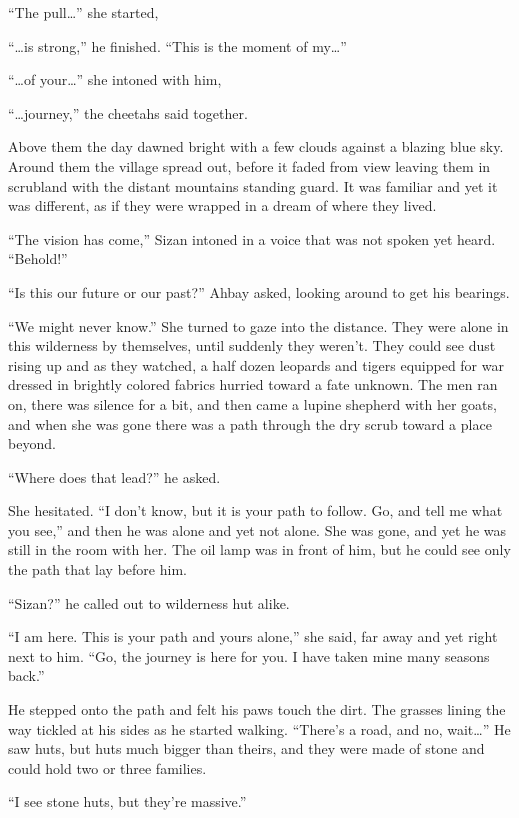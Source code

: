 ``The pull\ldots'' she started,

``\ldots{}is strong,'' he finished. ``This is the moment of my\ldots''

``\ldots{}of your\ldots'' she intoned with him,

``\ldots{}journey,'' the cheetahs said together.

Above them the day dawned bright with a few clouds against a blazing blue sky. Around them the village spread out, before it faded from view leaving them in scrubland with the distant mountains standing guard. It was familiar and yet it was different, as if they were wrapped in a dream of where they lived.

``The vision has come,'' Sizan intoned in a voice that was not spoken yet heard. ``Behold!''

``Is this our future or our past?'' Ahbay asked, looking around to get his bearings.

``We might never know.'' She turned to gaze into the distance. They were alone in this wilderness by themselves, until suddenly they weren't. They could see dust rising up and as they watched, a half dozen leopards and tigers equipped for war dressed in brightly colored fabrics hurried toward a fate unknown. The men ran on, there was silence for a bit, and then came a lupine shepherd with her goats, and when she was gone there was a path through the dry scrub toward a place beyond.

``Where does that lead?'' he asked.

She hesitated. ``I don't know, but it is your path to follow. Go, and tell me what you see,'' and then he was alone and yet not alone. She was gone, and yet he was still in the room with her. The oil lamp was in front of him, but he could see only the path that lay before him.

``Sizan?'' he called out to wilderness hut alike.

``I am here. This is your path and yours alone,'' she said, far away and yet right next to him. ``Go, the journey is here for you. I have taken mine many seasons back.''

He stepped onto the path and felt his paws touch the dirt. The grasses lining the way tickled at his sides as he started walking. ``There's a road, and no, wait\ldots'' He saw huts, but huts much bigger than theirs, and they were made of stone and could hold two or three families.

``I see stone huts, but they're massive.''

